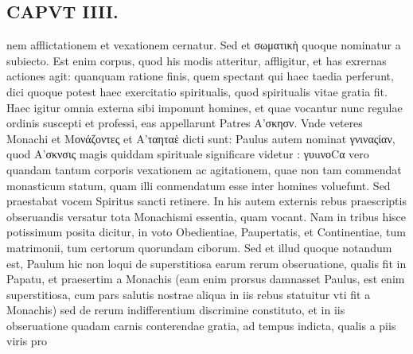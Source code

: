 \documentclass{article}
\begin{document}
\begin{pages}
\section*{CAPVT  IIII. }
\marginpar{[ p.209 ]}\pstart nem afflictationem et vexationem cernatur. Sed et σωματικὴ quoque nominatur a subiecto. Est enim corpus, quod his modis atteritur, affligitur, et has exrernas actiones agit: quanquam ratione finis, quem spectant qui haec taedia perferunt, dici quoque potest haec exercitatio spiritualis, quod spiritualis vitae gratia fit. Haec igitur omnia externa sibi imponunt homines, et quae vocantur nunc regulae ordinis suscepti et professi, eas appellarunt Patres Α’σκησν. Vnde veteres Monachi et Μονάζοντες et Α’ταηταὲ dicti sunt: Paulus autem nominat γνιναςίαν, quod Α'σκνσις magis quiddam spirituale significare videtur : γυuνοCα vero quandam tantum corporis vexationem ac agitationem, quae non tam commendat monasticum statum, quam illi conmendatum esse inter homines voluefunt. Sed praestabat vocem Spiritus sancti retinere. In his autem externis rebus praescriptis obseruandis versatur tota Monachismi essentia, quam vocant. Nam in tribus hisce potissimum posita dicitur, in voto Obedientiae, Paupertatis, et Continentiae, tum matrimonii, tum certorum quorundam ciborum. Sed et illud quoque notandum est, Paulum hic non loqui de superstitiosa earum rerum obseruatione, qualis fit in Papatu, et praesertim a Monachis (eam enim prorsus damnasset Paulus, est enim superstitiosa, cum pars salutis nostrae aliqua in iis rebus statuitur vti fit a Monachis) sed de rerum indifferentium discrimine constituto, et in iis obseruatione quadam carnis conterendae gratia, ad tempus indicta, qualis a piis viris pro  \pend

\end{pages}
\end{document}
